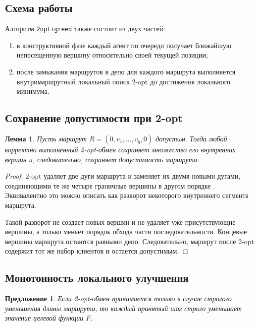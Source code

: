 \documentclass[a4paper,12pt]{article}
\newtheorem{lemma}{Лемма}[section]
\newtheorem{proposition}{Предложение}[section]
\newcommand{\obj}{F}
\begin{document}
\subsection{Схема работы}

Алгоритм \texttt{2opt+greed} также состоит из двух частей:
\begin{enumerate}[label=\arabic*.]
  \item в конструктивной фазе каждый агент по очереди получает ближайшую непосещенную
  вершину относительно своей текущей позиции;
  \item после замыкания маршрутов в депо для каждого маршрута выполняется внутримаршрутный
  локальный поиск 2-opt до достижения локального минимума.
\end{enumerate}

\subsection{Сохранение допустимости при 2-opt}

\begin{lemma}\label{lem:2opt-feasible}
Пусть маршрут \(R = (0,v_1,\dots,v_q,0)\) допустим. Тогда любой корректно выполненный
2-opt-обмен сохраняет множество его внутренних вершин и, следовательно, сохраняет
допустимость маршрута.
\end{lemma}

\begin{proof}
2-opt удаляет две дуги маршрута и заменяет их двумя новыми дугами, соединяющими те же
четыре граничные вершины в другом порядке \cite{croes1958}. Эквивалентно это можно
описать как разворот некоторого внутреннего сегмента маршрута.

Такой разворот не создает новых вершин и не удаляет уже присутствующие вершины, а только
меняет порядок обхода части последовательности. Концевые вершины маршрута остаются равными
депо. Следовательно, маршрут после 2-opt содержит тот же набор клиентов и остается
допустимым.
\end{proof}

\subsection{Монотонность локального улучшения}

\begin{proposition}
Если 2-opt-обмен принимается только в случае строгого уменьшения длины маршрута, то каждый
принятый шаг строго уменьшает значение целевой функции \(\obj\).
\end{proposition}
\end{document}
